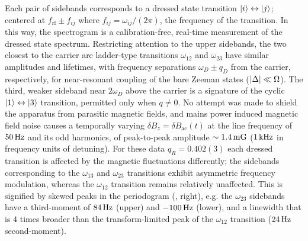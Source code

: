 \documentclass[aps,prl,reprint,superscriptaddress,floatfix]{revtex4-1}
\begin{document}
Each pair of sidebands corresponds to a dressed state transition $\vert i \rangle  \leftrightarrow \vert j \rangle $; centered at $f_{\text{rf}} \pm f_{ij}$ where $f_{ij} = \omega_{ij}/(2\pi)$, the frequency of the transition.
In this way, the spectrogram is a calibration-free, real-time measurement of the dressed state spectrum.
Restricting attention to the upper sidebands, the two closest to the carrier are ladder-type transitions $\omega_{12}$ and $\omega_{23}$ have similar amplitudes and lifetimes, with frequency separations $\omega_D \pm q_D$ from the carrier, respectively, for near-resonant coupling of the bare Zeeman states ($\vert \Delta \vert  \ll \Omega$).
The third, weaker sideband near $2\omega_D$ above the carrier is a signature of the cyclic $\vert 1 \rangle  \leftrightarrow \vert 3 \rangle $ transition, permitted only when $q\neq 0$.
No attempt was made to shield the apparatus from parasitic magnetic fields, and mains power induced magnetic field noise causes a temporally varying $\delta B_z = \delta B_{\text{ac}}(t)$ at the line frequency of $\unit[50]{Hz}$ and its odd harmonics, of peak-to-peak amplitude $\sim\unit[1.4]{mG}$ ($\unit[1]{kHz}$ in frequency units of detuning).
For these data $q_R = 0.402(3)$ each dressed transition is affected by the magnetic fluctuations differently; the sidebands corresponding to the $\omega_{13}$ and $\omega_{23}$ transitions exhibit asymmetric frequency modulation, whereas the $\omega_{12}$ transition remains relatively unaffected.
This is signified by skewed peaks in the periodogram (, right), e.g. the $\omega_{23}$ sidebands have a third-moment of $\unit[84]{Hz}$ (upper) and $-\unit[100]{Hz}$ (lower), and a linewidth that is $4$ times broader than the transform-limited peak of the $\omega_{12}$ transition ($\unit[24]{Hz}$ second-moment).
\end{document}
